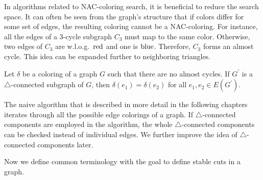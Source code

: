In algorithms related to NAC-coloring search, it is beneficial
to reduce the search space.
It can often be seen from the graph's structure
that if colors differ for some set of edges,
the resulting coloring cannot be a NAC-coloring.
%
For instance, all the edges of a 3-cycle subgraph \( C_3 \) must map to the same color.
Otherwise, two edges of \( C_3 \) are w.l.o.g.\ \( \text{red} \) and one is \( \text{blue} \).
Therefore, \( C_3 \) forms an almost cycle.
This idea can be expanded further to neighboring triangles.
%
%
\begin{lemma}
	Let \( \delta \) be a coloring of a graph \( G \) such that there are
	no almost cycles. If \( G^\prime \) is
	a \( \triangle \)-connected subgraph of \( G \),
	then \( \delta(e_1) = \delta(e_2) \) for all \( e_1, e_2 \in E(G^\prime) \).
\end{lemma}
%
The naive algorithm that is described in more detail in the following chapters
iterates through all the possible edge colorings of a graph.
If \( \triangle \)-connected components are employed in the algorithm,
the whole \( \triangle \)-connected components can be checked instead of individual edges.
We further improve the idea of \( \triangle \)-connected components later.

Now we define common terminology with the goal to define stable cuts in a graph.

